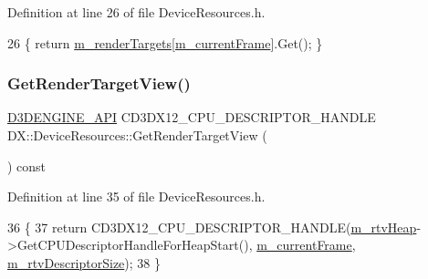 Definition at line 26 of file Device\+Resources.\+h.


\begin{DoxyCode}
26 \{ \textcolor{keywordflow}{return} \mbox{\hyperlink{class_d_x_1_1_device_resources_aa96cf4622c1a948b53dfd6f1a08a24cd}{m\_renderTargets}}[\mbox{\hyperlink{class_d_x_1_1_device_resources_ac5373e60722eaa25c1068aa754b501fa}{m\_currentFrame}}].Get(); \}
\end{DoxyCode}
\mbox{\label{class_d_x_1_1_device_resources_a65919d934ad59f2c11df12f74a28b915}} 
\subsubsection{\texorpdfstring{Get\+Render\+Target\+View()}{GetRenderTargetView()}}
{\footnotesize\ttfamily \mbox{\hyperlink{stdafx_8h_a8ee2d990c5dfba7794dd2b60741d7722}{D3\+D\+E\+N\+G\+I\+N\+E\+\_\+\+A\+PI}} C\+D3\+D\+X12\+\_\+\+C\+P\+U\+\_\+\+D\+E\+S\+C\+R\+I\+P\+T\+O\+R\+\_\+\+H\+A\+N\+D\+LE D\+X\+::\+Device\+Resources\+::\+Get\+Render\+Target\+View (\begin{DoxyParamCaption}{ }\end{DoxyParamCaption}) const\hspace{0.3cm}{\ttfamily [inline]}}



Definition at line 35 of file Device\+Resources.\+h.


\begin{DoxyCode}
36         \{
37             \textcolor{keywordflow}{return} CD3DX12\_CPU\_DESCRIPTOR\_HANDLE(\mbox{\hyperlink{class_d_x_1_1_device_resources_a23433ca65c8264c961778b97a309ea6a}{m\_rtvHeap}}->GetCPUDescriptorHandleForHeapStart(), 
      \mbox{\hyperlink{class_d_x_1_1_device_resources_ac5373e60722eaa25c1068aa754b501fa}{m\_currentFrame}}, \mbox{\hyperlink{class_d_x_1_1_device_resources_adc2a1e5cbd63c54ad5a2836348a33cb8}{m\_rtvDescriptorSize}});
38         \}
\end{DoxyCode}
\mbox{\label{class_d_x_1_1_device_resources_ab27be35d21e48abd8c6205e87b6b9cb7}} 
